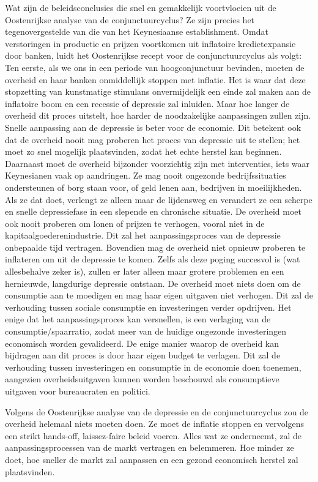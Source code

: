\documentclass[
  a5paper,
  smalldemyvopaper,10pt,twoside,onecolumn,openright,extrafontsizes,hidelinks]{memoir}
\begin{document}
Wat zijn de beleidsconclusies die snel en gemakkelijk voortvloeien uit
de Oostenrijkse analyse van de conjunctuurcyclus? Ze zijn precies het
tegenovergestelde van die van het Keynesiaanse establishment. Omdat
verstoringen in productie en prijzen voortkomen uit inflatoire
kredietexpansie door banken, luidt het Oostenrijkse recept voor de
conjunctuurcyclus als volgt: Ten eerste, als we ons in een periode van
hoogconjunctuur bevinden, moeten de overheid en haar banken onmiddellijk
stoppen met inflatie. Het is waar dat deze stopzetting van kunstmatige
stimulans onvermijdelijk een einde zal maken aan de inflatoire boom en
een recessie of depressie zal inluiden. Maar hoe langer de overheid dit
proces uitstelt, hoe harder de noodzakelijke aanpassingen zullen zijn.
Snelle aanpassing aan de depressie is beter voor de economie. Dit
betekent ook dat de overheid nooit mag proberen het proces van depressie
uit te stellen; het moet zo snel mogelijk plaatsvinden, zodat het echte
herstel kan beginnen. Daarnaast moet de overheid bijzonder voorzichtig
zijn met interventies, iets waar Keynesianen vaak op aandringen. Ze mag
nooit ongezonde bedrijfssituaties ondersteunen of borg staan voor, of
geld lenen aan, bedrijven in moeilijkheden. Als ze dat doet, verlengt ze
alleen maar de lijdensweg en verandert ze een scherpe en snelle
depressiefase in een slepende en chronische situatie. De overheid moet
ook nooit proberen om lonen of prijzen te verhogen, vooral niet in de
kapitaalgoederenindustrie. Dit zal het aanpassingsproces van de
depressie onbepaalde tijd vertragen. Bovendien mag de overheid niet
opnieuw proberen te inflateren om uit de depressie te komen. Zelfs als
deze poging succesvol is (wat allesbehalve zeker is), zullen er later
alleen maar grotere problemen en een hernieuwde, langdurige depressie
ontstaan. De overheid moet niets doen om de consumptie aan te moedigen
en mag haar eigen uitgaven niet verhogen. Dit zal de verhouding tussen
sociale consumptie en investeringen verder opdrijven. Het enige dat het
aanpassingsproces kan versnellen, is een verlaging van de
consumptie/spaarratio, zodat meer van de huidige ongezonde investeringen
economisch worden gevalideerd. De enige manier waarop de overheid kan
bijdragen aan dit proces is door haar eigen budget te verlagen. Dit zal
de verhouding tussen investeringen en consumptie in de economie doen
toenemen, aangezien overheidsuitgaven kunnen worden beschouwd als
consumptieve uitgaven voor bureaucraten en politici.

Volgens de Oostenrijkse analyse van de depressie en de conjunctuurcyclus
zou de overheid helemaal niets moeten doen. Ze moet de inflatie stoppen
en vervolgens een strikt hands-off, laissez-faire beleid voeren. Alles
wat ze onderneemt, zal de aanpassingsprocessen van de markt vertragen en
belemmeren. Hoe minder ze doet, hoe sneller de markt zal aanpassen en
een gezond economisch herstel zal plaatsvinden.
\end{document}
